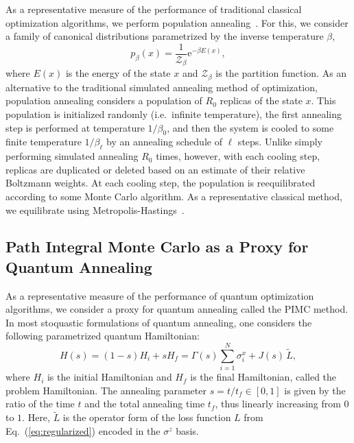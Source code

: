 \documentclass[aps,prd,twocolumn, superscriptaddress,preprintnumbers, nofootinbib,longbibliography,floatfix]{revtex4-2}
\DeclareRobustCommand{\Eq}[1]{Eq.~(\ref{#1})}
\newcommand{\ce}{\ensuremath{\textrm{e}}}
\begin{document}
As a representative measure of the performance of traditional classical optimization algorithms, we perform population annealing~\cite{doi:10.1063/1.1632130}. 
%
For this, we consider a family of canonical distributions parametrized by the inverse temperature $\beta$,
%
\begin{equation}
p_\beta(x)=\frac{1}{\mathcal{Z}_\beta}\ce^{-\beta E(x)},
\label{eq:distribution}
\end{equation}
%
where $E(x)$ is the energy of the state $x$ and $\mathcal{Z}_\beta$ is the partition function. 
%
As an alternative to the traditional simulated annealing method of optimization, population annealing considers a population of $R_0$ replicas of the state $x$.
%
This population is initialized randomly (i.e.~infinite temperature), the first annealing step is performed at temperature $1/\beta_0$, and then the system is cooled to some finite temperature $1/\beta_\ell$ by an annealing schedule of $\ell$ steps. 
%
Unlike simply performing simulated annealing $R_0$ times, however, with each cooling step, replicas are duplicated or deleted based on an estimate of their relative Boltzmann weights.
%
At each cooling step, the population is reequilibrated according to some Monte Carlo algorithm.
%
As a representative classical method, we equilibrate using Metropolis-Hastings~\cite{10.1093/biomet/57.1.97}.


\subsection{Path Integral Monte Carlo as a Proxy for Quantum Annealing} \label{sec:ReviewPIMC}

As a representative measure of the performance of quantum optimization algorithms, we consider a proxy for quantum annealing called the PIMC method.
%
In most stoquastic formulations of quantum annealing, one considers the following parametrized quantum Hamiltonian:
%
\begin{equation}
    H(s)=(1-s)H_i+sH_f=\Gamma(s)\sum\limits_{i=1}^N\sigma_i^x+J(s) \,\tilde{L},
    \label{eq:QA}
\end{equation}
%
where $H_i$ is the initial Hamiltonian and $H_f$ is the final Hamiltonian, called the problem Hamiltonian.
%
The annealing parameter $s=t/t_f\in\left[0,1\right]$ is given by the ratio of the time $t$ and the total annealing time $t_f$, thus linearly increasing from $0$ to $1$.
%
Here, $\tilde{L}$ is the operator form of the loss function $L$ from \Eq{eq:regularized} encoded in the $\sigma^z$ basis.
\end{document}
